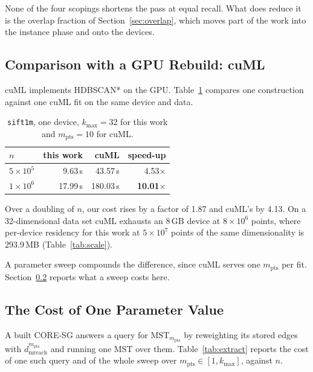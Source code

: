 \documentclass{ieeeaccess}
\newcommand{\kmax}{k_{\max}}
\newcommand{\mpts}{m_{\mathrm{pts}}}
\newcommand{\mrd}{d_{\mathrm{mreach}}}
\begin{document}
None of the four scopings shortens the pass at equal recall. What does reduce it
is the overlap fraction of Section~\ref{sec:overlap}, which moves part of the
work into the instance phase and onto the devices.

\subsection{Comparison with a GPU Rebuild: cuML}
\label{sec:cuml}

cuML \cite{cuml} implements HDBSCAN* on the GPU. Table~\ref{tab:cuml} compares
one construction against one cuML fit on the same device and data.

\begin{table}[!t]
\caption{\texttt{sift1m}, one device, $\kmax = 32$ for this work and
$\mpts = 10$ for cuML.}
\label{tab:cuml}
\centering
\footnotesize
\begin{tabular}{@{}lrrr@{}}
\toprule
$n$ & this work & cuML & speed-up \\
\midrule
$5\times10^5$ & 9.63\,s  & 43.57\,s  & 4.53$\times$ \\
$1\times10^6$ & 17.99\,s & 180.03\,s & \textbf{10.01}$\times$ \\
\bottomrule
\end{tabular}
\end{table}

Over a doubling of $n$, our cost rises by a factor of 1.87 and cuML's by 4.13.
On a 32-dimensional data set cuML exhausts an 8\,GB device at $8\times10^6$
points, where per-device residency for this work at $5\times10^7$ points of the
same dimensionality is 293.9\,MB (Table~\ref{tab:scale}).

A parameter sweep compounds the difference, since cuML serves one $\mpts$ per
fit. Section~\ref{sec:extract} reports what a sweep costs here.

\subsection{The Cost of One Parameter Value}
\label{sec:extract}

A built CORE-SG answers a query for $\mathrm{MST}_{\mpts}$ by reweighting its
stored edges with $\mrd^{\mpts}$ and running one MST over them.
Table~\ref{tab:extract} reports the cost of one such query and of the whole sweep
over $\mpts \in [1, \kmax]$, against $n$.
\end{document}
